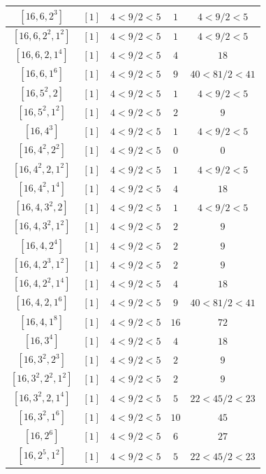 \documentclass{article}%
\begin{document}
\begin{center}
\begin{longtable}{||c|c|c|c|c||}
$[16, 6, 2^{3}]$ & $[1]$ & $4 < 9/2 < 5$ & $1$ & $4 < 9/2 < 5$ \\ \hline 
$[16, 6, 2^{2}, 1^{2}]$ & $[1]$ & $4 < 9/2 < 5$ & $1$ & $4 < 9/2 < 5$ \\ \hline 
$[16, 6, 2, 1^{4}]$ & $[1]$ & $4 < 9/2 < 5$ & $4$ & $18$ \\ \hline 
$[16, 6, 1^{6}]$ & $[1]$ & $4 < 9/2 < 5$ & $9$ & $40 < 81/2 < 41$ \\ \hline 
$[16, 5^{2}, 2]$ & $[1]$ & $4 < 9/2 < 5$ & $1$ & $4 < 9/2 < 5$ \\ \hline 
$[16, 5^{2}, 1^{2}]$ & $[1]$ & $4 < 9/2 < 5$ & $2$ & $9$ \\ \hline 
$[16, 4^{3}]$ & $[1]$ & $4 < 9/2 < 5$ & $1$ & $4 < 9/2 < 5$ \\ \hline 
$[16, 4^{2}, 2^{2}]$ & $[1]$ & $4 < 9/2 < 5$ & $0$ & $0$ \\ \hline 
$[16, 4^{2}, 2, 1^{2}]$ & $[1]$ & $4 < 9/2 < 5$ & $1$ & $4 < 9/2 < 5$ \\ \hline 
$[16, 4^{2}, 1^{4}]$ & $[1]$ & $4 < 9/2 < 5$ & $4$ & $18$ \\ \hline 
$[16, 4, 3^{2}, 2]$ & $[1]$ & $4 < 9/2 < 5$ & $1$ & $4 < 9/2 < 5$ \\ \hline 
$[16, 4, 3^{2}, 1^{2}]$ & $[1]$ & $4 < 9/2 < 5$ & $2$ & $9$ \\ \hline 
$[16, 4, 2^{4}]$ & $[1]$ & $4 < 9/2 < 5$ & $2$ & $9$ \\ \hline 
$[16, 4, 2^{3}, 1^{2}]$ & $[1]$ & $4 < 9/2 < 5$ & $2$ & $9$ \\ \hline 
$[16, 4, 2^{2}, 1^{4}]$ & $[1]$ & $4 < 9/2 < 5$ & $4$ & $18$ \\ \hline 
$[16, 4, 2, 1^{6}]$ & $[1]$ & $4 < 9/2 < 5$ & $9$ & $40 < 81/2 < 41$ \\ \hline 
$[16, 4, 1^{8}]$ & $[1]$ & $4 < 9/2 < 5$ & $16$ & $72$ \\ \hline 
$[16, 3^{4}]$ & $[1]$ & $4 < 9/2 < 5$ & $4$ & $18$ \\ \hline 
$[16, 3^{2}, 2^{3}]$ & $[1]$ & $4 < 9/2 < 5$ & $2$ & $9$ \\ \hline 
$[16, 3^{2}, 2^{2}, 1^{2}]$ & $[1]$ & $4 < 9/2 < 5$ & $2$ & $9$ \\ \hline 
$[16, 3^{2}, 2, 1^{4}]$ & $[1]$ & $4 < 9/2 < 5$ & $5$ & $22 < 45/2 < 23$ \\ \hline 
$[16, 3^{2}, 1^{6}]$ & $[1]$ & $4 < 9/2 < 5$ & $10$ & $45$ \\ \hline 
$[16, 2^{6}]$ & $[1]$ & $4 < 9/2 < 5$ & $6$ & $27$ \\ \hline 
$[16, 2^{5}, 1^{2}]$ & $[1]$ & $4 < 9/2 < 5$ & $5$ & $22 < 45/2 < 23$ \\ \hline 

\end{longtable}
\end{center}
\end{document}
